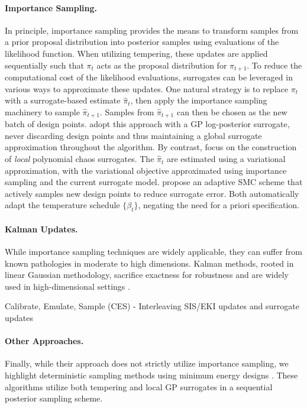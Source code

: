 \documentclass[12pt]{article}
\begin{document}
\paragraph{Importance Sampling.}
In principle, importance sampling provides the means to transform samples from a prior proposal 
distribution into posterior samples using evaluations of the likelihood function.
When utilizing tempering, these updates are applied sequentially such that $\pi_t$ acts as the 
proposal distribution for $\pi_{t+1}$. To reduce the computational cost of the likelihood evaluations, 
surrogates can be leveraged in various ways to approximate these updates. One natural strategy is to replace 
$\pi_t$ with a surrogate-based estimate $\hat{\pi}_t$, then apply the importance sampling 
machinery to sample $\hat{\pi}_{t+1}$. Samples from $\hat{\pi}_{t+1}$ can then 
be chosen as the new batch of design points. \citet{quantileApprox} adopt this approach
with a GP log-posterior surrogate, never discarding design points and thus maintaining 
a global surrogate approximation throughout the algorithm. By contrast, \citet{Li_2014}
focus on the construction of \textit{local} polynomial chaos surrogates. The $\hat{\pi}_t$
are estimated using a variational approximation, with the variational objective approximated
using importance sampling and the current surrogate model.
\citet{activeReducedTempering} propose an adaptive SMC scheme that actively samples new 
design points to reduce surrogate error. Both \citet{Li_2014,activeReducedTempering}
automatically adapt the temperature schedule $\{\beta_t\}$, negating the need for 
a priori specification.

\paragraph{Kalman Updates.}
While importance sampling techniques are widely applicable, they can suffer from known pathologies
in moderate to high dimensions. Kalman methods, rooted in linear Gaussian methodology, sacrifice 
exactness for robustness and are widely used in high-dimensional settings . 

Calibrate, Emulate, Sample (CES)
- Interleaving SIS/EKI updates and surrogate updates

\paragraph{Other Approaches.}
Finally, while their approach does not 
strictly utilize importance sampling, we highlight deterministic sampling methods using 
minimum energy designs \citep{JosephMEDSampling,JosephMinEnergy}. These algorithms utilize 
both tempering and local GP surrogates in a sequential posterior sampling scheme.
\end{document}
